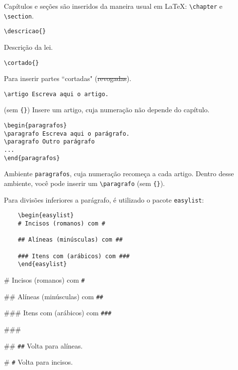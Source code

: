 \documentclass{ltxdoc}
\newcommand{\cortado}[1]{\sout{#1}}
\newcommand{\nota}[1]{\marginpar{\hfill \cmd{#1}}}
\begin{document}
Capítulos e seções são inseridos da maneira usual em \LaTeX: \verb|\chapter| e \verb|\section|.   


\begin{verbatim}\descricao{}
\end{verbatim}
\nota{\descricao\marg{Descrição}} 
Descrição da lei.


\begin{verbatim}\cortado{}
\end{verbatim}
\nota{\cortado\marg} 
Para inserir partes ``cortadas" (\cortado{revogadas}).


\begin{verbatim}
\artigo Escreva aqui o artigo.
\end{verbatim}
 
\cmd{\artigo} (sem \verb|{}|)\nota{\artigo} Insere um artigo, cuja numeração não depende do capítulo.



\begin{verbatim}
\begin{paragrafos}
\paragrafo Escreva aqui o parágrafo.
\paragrafo Outro parágrafo
...
\end{paragrafos}
\end{verbatim}

Ambiente \texttt{paragrafos},\nota{\paragrafo} cuja numeração recomeça a cada artigo. Dentro desse ambiente, você pode inserir um \verb|\paragrafo| (sem \verb|{}|). 

Para divisões inferiores a parágrafo, é utilizado o pacote \texttt{easylist}:

\begin{verbatim}
	\begin{easylist}
	# Incisos (romanos) com #
	
	## Alíneas (minúsculas) com ##
	
	### Itens com (arábicos) com ###
	\end{easylist}
\end{verbatim}
	
	

\begin{easylist}
	# Incisos (romanos) com \verb|#|
	
	## Alíneas (minúsculas) com \verb|##|
	
	### Itens com (arábicos) com \verb|###|
	
	###
	
	## \verb|##| Volta para alíneas.
	
	# \verb|#| Volta para incisos.
	\end{easylist}
\end{document}
